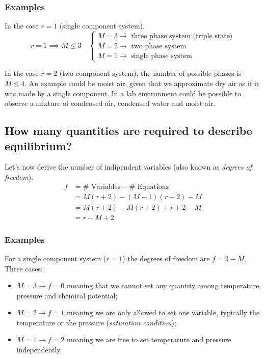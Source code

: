 \subsubsection{Examples}
In the case $r=1$ (single component system),
\begin{equation*}
    r=1 \implies M \le 3 \quad
    \begin{cases}
        M = 3 \to \text{ three phase system (triple state)} \\
        M = 2 \to \text{ two phase system} \\
        M = 1 \to \text{ single phase system}
    \end{cases}
\end{equation*}

In the case $r=2$ (two component system), the number of possible phases is $M
\le 4$. An example could be moist air, given that we approximate dry air as if
it was made by a single component. In a lab environment could be possible to
observe a mixture of condensed air, condensed water and moist air.

\subsection{How many quantities are required to describe equilibrium?}
Let’s now derive the number of indipendent variables (also known as
\emph{degrees of freedom}):
\begin{align*}
    f &= \#\text{ Variables} - \#\text{ Equations} \\
    &= M(r+2) - (M-1)(r+2) - M \\
    &= M(r+2) - M(r+2) + r+2 - M \\
    &= r - M + 2
\end{align*}

\subsubsection{Examples}
For a single component system ($r=1$) the degrees of freedom are $f=3-M$. Three
cases:
\begin{itemize}
    \item $M=3 \to f=0$ meaning that we cannot set any quantity among
    temperature, pressure and chemical potential;
    \item $M=2 \to f=1$ meaning we are only allowed to set one variable,
    typically the temperature or the pressure (\emph{saturation condition});
    \item $M=1 \to f=2$ meaning we are free to set temperature and pressure
    independently.
\end{itemize}

